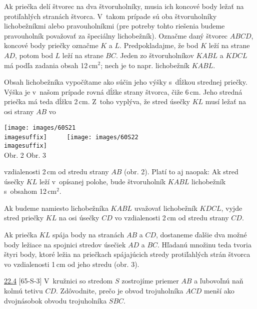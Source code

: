 \rieh Ak priečka delí štvorec na dva štvoruholníky, musia ich koncové body ležať na protiľahlých stranách štvorca. V~takom prípade sú oba štvoruholníky lichobežníkmi alebo pravouholníkmi (pre potreby tohto riešenia budeme pravouholník považovať za špeciálny lichobežník). Označme daný štvorec $ABCD$, koncové body priečky označme $K$ a $L$. Predpokladajme, že bod $K$ leží na strane $AD$, potom bod $L$ leží na strane $BC$. Jeden zo štvoruholníkov $KABL$ a $KDCL$ má podľa zadania obsah 12\,cm$^2$; nech je to napr. lichobežník $KABL$.

Obsah lichobežníka vypočítame ako súčin jeho výšky s~dĺžkou strednej priečky. Výška je v~našom prípade rovná dĺžke strany štvorca, čiže 6\,cm. Jeho stredná priečka má teda dĺžku 2\,cm. Z~toho vyplýva, že stred úsečky $KL$ musí ležať na osi strany $AB$ vo
\begin{center}
\texttt{[image: images/60S21\\imagesuffix]} \ \ \ \ \ \texttt{[image: images/60S22\\imagesuffix]} \\

Obr. 2 \hspace{130pt} Obr. 3
\end{center}
vzdialenosti 2\,cm od stredu strany $AB$ (obr. 2). Platí to aj naopak: Ak stred úsečky $KL$ leží v~opísanej polohe, bude štvoruholník $KABL$ lichobežník s~obsahom 12\,cm$^2$.

Ak budeme namiesto lichobežníka $KABL$ uvažovať lichobežník $KDCL$, vyjde stred priečky $KL$ na osi úsečky $CD$ vo vzdialenosti 2\,cm od stredu strany $CD$.

Ak priečka $KL$ spája body na stranách $AB$ a $CD$, dostaneme ďalšie dva možné body ležiace na spojnici stredov úsečiek $AD$ a $BC$. Hľadanú množinu teda tvoria štyri body, ktoré ležia na priečkach spájajúcich stredy protiľahlých strán štvorca vo vzdialenosti 1\,cm od jeho stredu (obr. 3).

\begin{tcolorbox}[breakable,notitle,boxrule=0pt,colback=light-gray,colframe=light-gray]\ul{22.4} [65-S-3] V~kružnici so stredom $S$ zostrojíme priemer $AB$ a ľubovoľnú naň kolmú tetivu $CD$. Zdôvodnite, prečo je obvod trojuholníka $ACD$ menší ako dvojnásobok obvodu trojuholníka $SBC$.

\end{tcolorbox}

